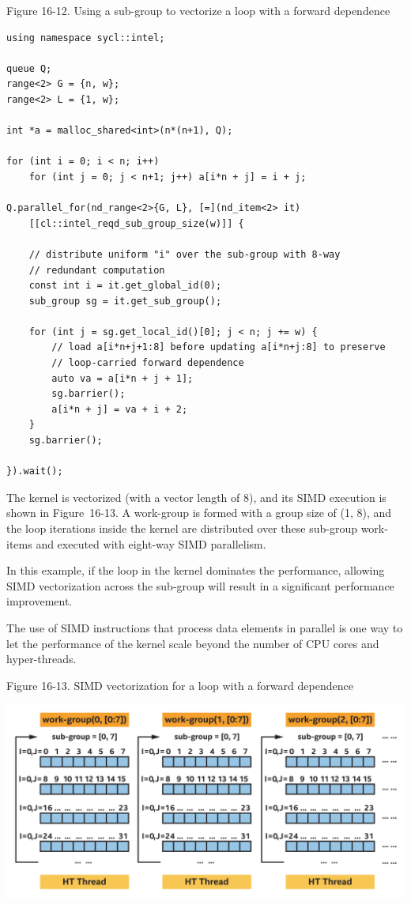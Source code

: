 \hspace*{\fill} \par %
Figure 16-12. Using a sub-group to vectorize a loop with a forward dependence
\begin{lstlisting}[caption={}]
using namespace sycl::intel;

queue Q;
range<2> G = {n, w};
range<2> L = {1, w};

int *a = malloc_shared<int>(n*(n+1), Q);

for (int i = 0; i < n; i++)
	for (int j = 0; j < n+1; j++) a[i*n + j] = i + j;
	
Q.parallel_for(nd_range<2>{G, L}, [=](nd_item<2> it)
	[[cl::intel_reqd_sub_group_size(w)]] {
		
	// distribute uniform "i" over the sub-group with 8-way
	// redundant computation
	const int i = it.get_global_id(0);
	sub_group sg = it.get_sub_group();
	
	for (int j = sg.get_local_id()[0]; j < n; j += w) {
		// load a[i*n+j+1:8] before updating a[i*n+j:8] to preserve
		// loop-carried forward dependence
		auto va = a[i*n + j + 1];
		sg.barrier();
		a[i*n + j] = va + i + 2;
	}
	sg.barrier();
	
}).wait();
\end{lstlisting}

The kernel is vectorized (with a vector length of 8), and its SIMD execution is shown in Figure 16-13. A work-group is formed with a group size of (1, 8), and the loop iterations inside the kernel are distributed over these sub-group work-items and executed with eight-way SIMD parallelism.\par

In this example, if the loop in the kernel dominates the performance, allowing SIMD vectorization across the sub-group will result in a significant performance improvement.\par

The use of SIMD instructions that process data elements in parallel is one way to let the performance of the kernel scale beyond the number of CPU cores and hyper-threads.\par

\hspace*{\fill} \par %
Figure 16-13. SIMD vectorization for a loop with a forward dependence
\begin{center}
	\includegraphics[width=1.0\textwidth]{content/chapter-16/images/7}
\end{center}

